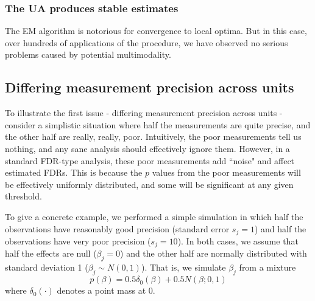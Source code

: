 \documentclass[11pt]{article}
\begin{document}
\subsubsection*{The UA produces stable estimates}

The EM algorithm is notorious for convergence to local optima. 
But in this case, over hundreds of applications of the procedure, we have observed no serious problems 
caused by potential multimodality. 






\subsection*{Differing measurement precision across units}

 To illustrate the first issue - differing measurement precision across units - consider a simplistic
 situation where half the measurements are quite precise, and the other half are really, really, poor. 
 Intuitively, the poor measurements tell us nothing, and any sane analysis should effectively ignore them. However, in a standard FDR-type analysis, these poor measurements add ``noise" and affect estimated FDRs. This is because the $p$ values from the poor measurements will be effectively uniformly distributed, and some will be significant at any given threshold. 
 
To give a concrete example, we performed a simple simulation in which half the observations have
reasonably good precision (standard error $s_j = 1$) and half the observations have very poor precision ($s_j=10$). In both cases,
we assume that half the effects are null ($\beta_j=0$)
and the other half are normally distributed with standard deviation 1 ($\beta_j \sim N(0,1)$). 
That is, we simulate $\beta_j$ from a mixture 
\begin{equation}
p(\beta) = 0.5 \delta_0(\beta) + 0.5 N(\beta; 0,1)
\end{equation}
where $\delta_0(\cdot)$ denotes a point mass at 0.
\end{document}
